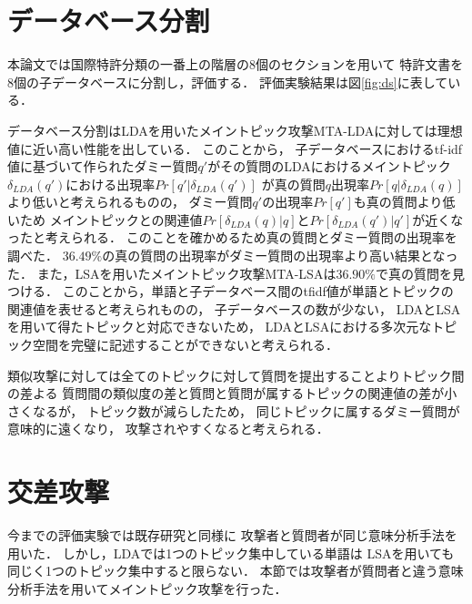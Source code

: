 \documentclass[master]{suribt}
\theoremstyle{definition}
\begin{document}
  
 \section{データベース分割}
 本論文では国際特許分類の一番上の階層の8個のセクションを用いて
 特許文書を8個の子データベースに分割し，評価する．
 評価実験結果は図\ref{fig:ds}に表している．
 
 データベース分割はLDAを用いたメイントピック攻撃MTA-LDAに対しては理想値に近い高い性能を出している．
 このことから，
 子データベースにおけるtf-idf値に基づいて作られたダミー質問$q'$がその質問のLDAにおけるメイントピック$\delta_{LDA}(q')$における出現率$Pr[q'|\delta_{LDA}(q')]$
 が真の質問$q$出現率$Pr[q|\delta_{LDA}(q)]$より低いと考えられるものの，
 ダミー質問$q'$の出現率$Pr[q']$も真の質問より低いため
 メイントピックとの関連値$Pr[\delta_{LDA}(q)|q]$と$Pr[\delta_{LDA}(q')|q']$が近くなったと考えられる．
 このことを確かめるため真の質問とダミー質問の出現率を調べた．
 $36.49\%$の真の質問の出現率がダミー質問の出現率より高い結果となった．
 また，LSAを用いたメイントピック攻撃MTA-LSAは$36.90\%$で真の質問を見つける．
 このことから，単語と子データベース間のtfidf値が単語とトピックの関連値を表せると考えられものの，
 子データベースの数が少ない，
 LDAとLSAを用いて得たトピックと対応できないため，
 LDAとLSAにおける多次元なトピック空間を完璧に記述することができないと考えられる．
  
 類似攻撃に対しては全てのトピックに対して質問を提出することよりトピック間の差よる
 質問間の類似度の差と質問と質問が属するトピックの関連値の差が小さくなるが，
 トピック数が減らしたため，
 同じトピックに属するダミー質問が意味的に遠くなり，
 攻撃されやすくなると考えられる． 　

 \section{交差攻撃}

 今までの評価実験では既存研究と同様に
 攻撃者と質問者が同じ意味分析手法を用いた．
 しかし，LDAでは1つのトピック集中している単語は
 LSAを用いても同じく1つのトピック集中すると限らない．
 本節では攻撃者が質問者と違う意味分析手法を用いてメイントピック攻撃を行った．
\end{document}
